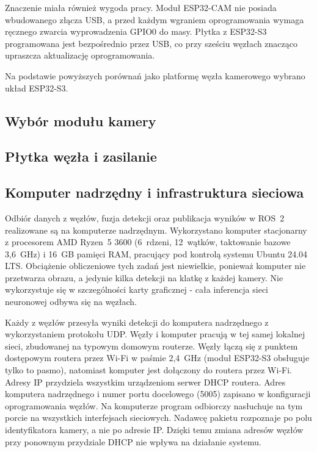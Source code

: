 Znaczenie miała również wygoda pracy. Moduł ESP32-CAM nie posiada
wbudowanego złącza USB, a przed każdym wgraniem oprogramowania wymaga
ręcznego zwarcia wyprowadzenia GPIO0 do masy. Płytka z ESP32-S3 programowana
jest bezpośrednio przez USB, co przy sześciu węzłach znacząco upraszcza
aktualizację oprogramowania.
 
 
Na podstawie powyższych porównań jako platformę węzła kamerowego wybrano
układ ESP32-S3.

\subsection{Wybór modułu kamery}
\label{subsec:kamera}


\subsection{Płytka węzła i zasilanie}
\label{subsec:plytka-zasilanie}


\subsection{Komputer nadrzędny i infrastruktura sieciowa}
\label{subsec:komputer-siec}

Odbiór danych z węzłów, fuzja detekcji oraz publikacja wyników w ROS~2
realizowane są na komputerze nadrzędnym. Wykorzystano komputer stacjonarny
z procesorem AMD Ryzen~5 3600 (6~rdzeni, 12~wątków, taktowanie bazowe
3,6~GHz) i 16~GB pamięci RAM, pracujący pod kontrolą systemu Ubuntu 24.04 LTS. Obciążenie obliczeniowe tych zadań jest niewielkie, ponieważ
komputer nie przetwarza obrazu, a jedynie kilka detekcji na klatkę
z każdej kamery. Nie wykorzystuje się w szczególności karty graficznej -
cała inferencja sieci neuronowej odbywa się na węzłach.

Każdy z węzłów przesyła wyniki detekcji do komputera nadrzędnego
z wykorzystaniem protokołu UDP. Węzły i komputer pracują w tej samej
lokalnej sieci, zbudowanej na typowym domowym routerze. Węzły łączą się
z punktem dostępowym routera przez Wi-Fi w paśmie 2,4~GHz (moduł ESP32-S3
obsługuje tylko to pasmo), natomiast komputer jest dołączony do routera
przez Wi-Fi. Adresy IP przydziela
wszystkim urządzeniom serwer DHCP routera. Adres komputera nadrzędnego
i numer portu docelowego (5005) zapisano w konfiguracji oprogramowania
węzłów. Na komputerze program odbiorczy nasłuchuje na tym porcie na
wszystkich interfejsach sieciowych. Nadawcę pakietu rozpoznaje po polu
identyfikatora kamery, a nie po adresie IP. Dzięki temu zmiana adresów
węzłów przy ponownym przydziale DHCP nie wpływa na działanie systemu.

